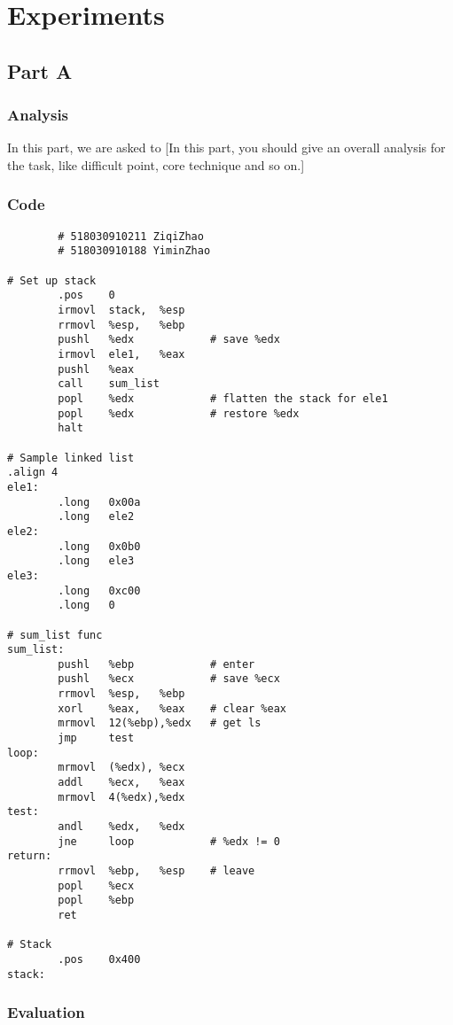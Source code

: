 \documentclass{article}
\begin{document}
\section{Experiments}
\subsection{Part A}
\subsubsection{Analysis}
In this part, we are asked to 
[In this part, you should give an overall analysis for the task, 
like difficult point, core technique and so on.]

\subsubsection{Code}

\begin{lstlisting}
        # 518030910211 ZiqiZhao
        # 518030910188 YiminZhao

# Set up stack
        .pos    0
        irmovl  stack,  %esp
        rrmovl  %esp,   %ebp
        pushl   %edx            # save %edx
        irmovl  ele1,   %eax
        pushl   %eax
        call    sum_list
        popl    %edx            # flatten the stack for ele1
        popl    %edx            # restore %edx
        halt

# Sample linked list 
.align 4
ele1:
        .long   0x00a
        .long   ele2
ele2:
        .long   0x0b0
        .long   ele3
ele3:
        .long   0xc00
        .long   0

# sum_list func
sum_list:
        pushl   %ebp            # enter
        pushl   %ecx            # save %ecx
        rrmovl  %esp,   %ebp
        xorl    %eax,   %eax    # clear %eax
        mrmovl  12(%ebp),%edx   # get ls
        jmp     test
loop:
        mrmovl  (%edx), %ecx
        addl    %ecx,   %eax
        mrmovl  4(%edx),%edx
test:
        andl    %edx,   %edx
        jne     loop            # %edx != 0
return:
        rrmovl  %ebp,   %esp    # leave
        popl    %ecx
        popl    %ebp
        ret

# Stack 
        .pos    0x400
stack:
\end{lstlisting}


\subsubsection{Evaluation}
\end{document}
